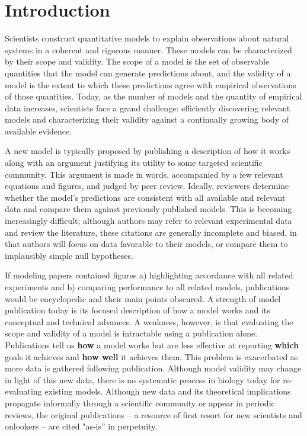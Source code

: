 \documentclass[11pt,letterpaper]{article}
\begin{document}
\section{Introduction}
Scientists construct quantitative models to explain observations about natural systems in a coherent and rigorous manner. These models can be characterized by their scope and validity. The scope of a model is the set of observable quantities that the model can generate predictions about, and the validity of a model is the extent to which these predictions agree with empirical observations of those quantities. Today, as the number of models and the quantity of empirical data increases, scientists face a grand challenge: efficiently discovering relevant models and characterizing their validity against a continually growing body of available evidence. 

A new model is typically proposed by publishing a description of how it works along with an argument justifying its utility to some targeted scientific community. This argument is made in words, accompanied by a few relevant equations and figures, and judged by peer review. Ideally, reviewers determine whether the model's predictions are consistent with all available and relevant data and compare them against previously published models. This is becoming increasingly difficult; although authors may refer to relevant experimental data and review the literature, these citations are generally incomplete and biased, in that authors will focus on data favorable to their models, or compare them to implausibly simple null hypotheses.

If modeling papers contained figures a) highlighting accordance with all related experiments and b) comparing performance to all related models, publications would be encyclopedic and their main points obscured. A strength of model publication today is its focused description of how a model works and its conceptual and technical advances. A weakness, however, is that evaluating the scope and validity of a model is intractable using a publication alone. Publications tell us \textbf{how} a model works but are less effective at reporting \textbf{which} goals it achieves and \textbf{how well} it achieves them. This problem is exacerbated as more data is gathered following publication. Although model validity may change in light of this new data, there is no systematic process in biology today for re-evaluating existing models. Although new data and its theoretical implications propagate informally through a scientific community or appear in periodic reviews, the original publications -- a resource of first resort for new scientists and onlookers -- are cited "as-is'' in perpetuity. 	
\end{document}
